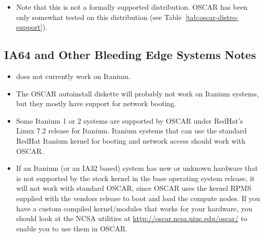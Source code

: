 \begin{itemize}
\item Note that this is not a formally supported distribution.  OSCAR
  \oscarversion has been only somewhat tested on this distribution
  (see Table~\ref{tab:oscar-distro-support}).
\end{itemize}


\subsection{IA64 and Other Bleeding Edge Systems Notes}
\label{subsec:ia64notes}

\begin{itemize}
\item {} does not currently work on Itanium.

\item The OSCAR autoinstall diskette will probably not work
on Itanium systems, but they mostly have support for network booting.

\item Some Itanium 1 or 2 systems are supported by OSCAR 
under RedHat's Linux 7.2 release for Itanium.
Itanium systems that can use the standard RedHat Itanium
kernel for booting and network access should work with OSCAR.

\item If an Itanium (or an IA32 based) system 
has new or unknown hardware that is not supported by
the stock kernel in the base operating system release,
it will not work with standard OSCAR, since OSCAR uses the
kernel RPMS supplied with the vendors release to boot and
load the compute nodes.
If you have a custom compiled kernel/modules that works
for your hardware, you should look at the NCSA utilities
at \url{http://oscar.ncsa.uiuc.edu/oscar/} to enable you
to use them in OSCAR.

\end{itemize}




